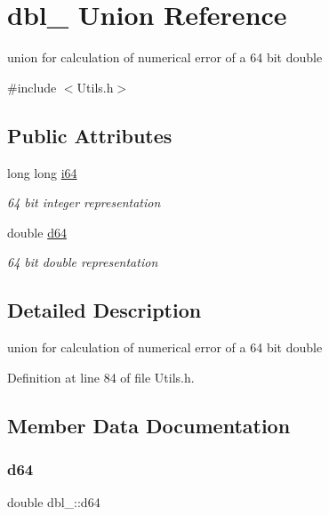 \hypertarget{uniondbl__64}{}\section{dbl\+\_ Union Reference}
\label{uniondbl__64}


union for calculation of numerical error of a 64 bit double  




{\ttfamily \#include $<$Utils.\+h$>$}

\subsection*{Public Attributes}
\begin{DoxyCompactItemize}
\item 
long long \hyperlink{uniondbl__64_a6f97524990aa26aaa1618b7288301841}{i64}
\begin{DoxyCompactList}\small\item\em 64 bit integer representation \end{DoxyCompactList}\item 
double \hyperlink{uniondbl__64_a6007036e300f1924037fc32c8bec660c}{d64}
\begin{DoxyCompactList}\small\item\em 64 bit double representation \end{DoxyCompactList}\end{DoxyCompactItemize}


\subsection{Detailed Description}
union for calculation of numerical error of a 64 bit double 

Definition at line 84 of file Utils.\+h.



\subsection{Member Data Documentation}
\mbox{\label{uniondbl__64_a6007036e300f1924037fc32c8bec660c}} 
\subsubsection{\texorpdfstring{d64}{d64}}
{\footnotesize\ttfamily double dbl\+\_\+::d64}



